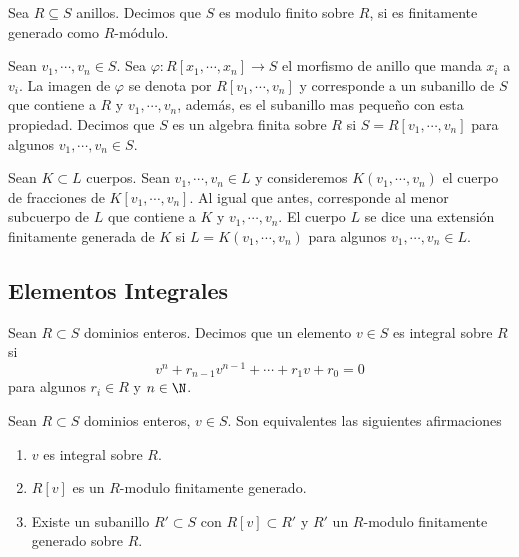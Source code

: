 \documentclass{article}
\begin{document}
\noindent Sea $R\subseteq S$ anillos. Decimos que $S$ es modulo finito sobre $R$, si es 
finitamente generado como $R$-módulo.
\vspace{4mm}

\noindent Sean $v_{1},\cdots,v_{n}\in S$. Sea $\varphi:R[x_{1},\cdots,x_{n}]\to S$ el morfismo
de anillo que manda $x_{i}$ a $v_{i}$. La imagen de $\varphi$ se denota por 
$R[v_{1},\cdots,v_{n}]$ y corresponde a un subanillo de $S$ que contiene a $R$ y 
$v_{1},\cdots,v_{n}$, además, es el subanillo mas pequeño con esta propiedad. Decimos que $S$ es 
un algebra finita sobre $R$ si $S=R[v_{1},\cdots,v_{n}]$ para algunos $v_{1},\cdots,v_{n}\in S$.
\vspace{4mm}

\noindent Sean $K\subset L$ cuerpos. Sean $v_{1},\cdots,v_{n}\in L$ y consideremos 
$K(v_{1},\cdots,v_{n})$ el cuerpo de fracciones de  $K[v_{1},\cdots,v_{n}]$. Al igual que antes,
corresponde al menor subcuerpo de $L$ que contiene a $K$ y $v_{1},\cdots,v_{n}$. El cuerpo $L$ se
dice una extensión finitamente generada de $K$ si $L=K(v_{1},\cdots,v_{n})$ para algunos
$v_{1},\cdots,v_{n}\in L$.

\subsection{Elementos Integrales}
\begin{dfn}
    Sean $R\subset S$ dominios enteros. Decimos que un elemento $v\in S$ es integral sobre $R$ si
    \begin{equation*}
        v^{n}+r_{n-1}v^{n-1}+\cdots+r_{1}v+r_{0}=0
    \end{equation*}
    para algunos $r_{i}\in R$ y $n\in\N$.
\end{dfn}

\begin{prop}
    Sean $R\subset S$ dominios enteros, $v\in S$. Son equivalentes las siguientes afirmaciones
    \begin{enumerate}
        \item $v$ es integral sobre $R$.
        \item $R[v]$ es un $R$-modulo finitamente generado.
        \item Existe un subanillo $R'\subset S$ con $R[v]\subset R'$ y $R'$ un $R$-modulo 
        finitamente generado sobre $R$.
    \end{enumerate}
\end{prop}
\end{document}
